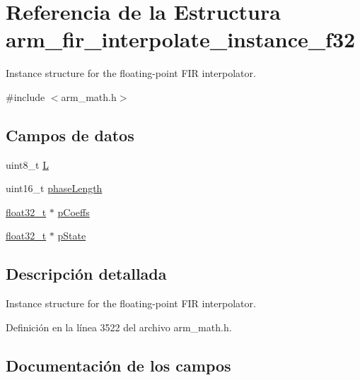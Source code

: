 \hypertarget{structarm__fir__interpolate__instance__f32}{}\section{Referencia de la Estructura arm\+\_\+fir\+\_\+interpolate\+\_\+instance\+\_\+f32}
\label{structarm__fir__interpolate__instance__f32}


Instance structure for the floating-\/point F\+IR interpolator.  




{\ttfamily \#include $<$arm\+\_\+math.\+h$>$}

\subsection*{Campos de datos}
\begin{DoxyCompactItemize}
\item 
uint8\+\_\+t \hyperlink{structarm__fir__interpolate__instance__f32_aee73cc056696e504430c53eaa9c58cf0}{L}
\item 
uint16\+\_\+t \hyperlink{structarm__fir__interpolate__instance__f32_a8f92bb07e0812f94679438cdf412b26a}{phase\+Length}
\item 
\hyperlink{arm__math_8h_a4611b605e45ab401f02cab15c5e38715}{float32\+\_\+t} $\ast$ \hyperlink{structarm__fir__interpolate__instance__f32_aacbb8dd8eeba4b21fc2bb40076405ee3}{p\+Coeffs}
\item 
\hyperlink{arm__math_8h_a4611b605e45ab401f02cab15c5e38715}{float32\+\_\+t} $\ast$ \hyperlink{structarm__fir__interpolate__instance__f32_a335c87e6fdc4b96601d95a5de8b9c463}{p\+State}
\end{DoxyCompactItemize}


\subsection{Descripción detallada}
Instance structure for the floating-\/point F\+IR interpolator. 

Definición en la línea 3522 del archivo arm\+\_\+math.\+h.



\subsection{Documentación de los campos}
